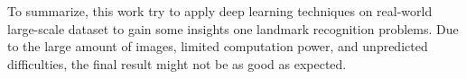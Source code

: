 \documentclass{article}
\begin{document}
To summarize, this work try to apply deep learning techniques on real-world large-scale dataset to gain some insights one landmark recognition problems. Due to the large amount of images, limited computation power, and unpredicted difficulties, the final result might not be as good as expected.



\vfill\pagebreak


%

\end{document}
